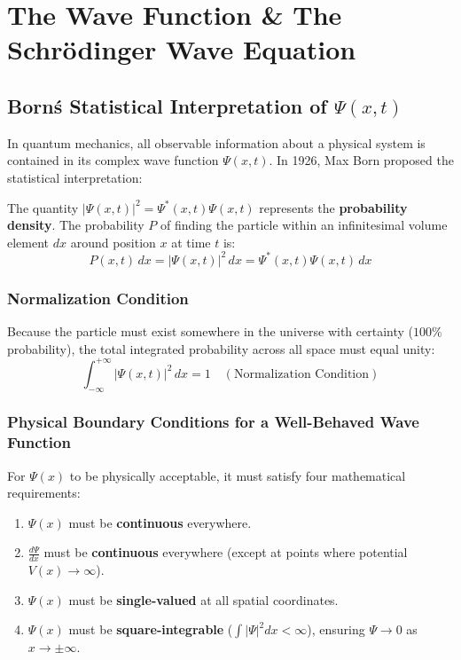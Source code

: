 \section{The Wave Function \& The Schrödinger Wave Equation}

\subsection{Born\'s Statistical Interpretation of \texorpdfstring{$\Psi(x,t)$}{Psi(x,t)}}
In quantum mechanics, all observable information about a physical system is contained in its complex wave function $\Psi(x,t)$. In 1926, Max Born proposed the statistical interpretation:

\begin{definition}
The quantity $|\Psi(x,t)|^2 = \Psi^*(x,t) \Psi(x,t)$ represents the \textbf{probability density}. The probability $P$ of finding the particle within an infinitesimal volume element $dx$ around position $x$ at time $t$ is:
\begin{equation}
    P(x,t)\,dx = |\Psi(x,t)|^2\,dx = \Psi^*(x,t)\Psi(x,t)\,dx
\end{equation}
\end{definition}

\subsubsection{Normalization Condition}
Because the particle must exist somewhere in the universe with certainty ($100\%$ probability), the total integrated probability across all space must equal unity:
\begin{equation}
    \int_{-\infty}^{+\infty} |\Psi(x,t)|^2\,dx = 1 \quad (\text{Normalization Condition})
\end{equation}

\subsubsection{Physical Boundary Conditions for a Well-Behaved Wave Function}
For $\Psi(x)$ to be physically acceptable, it must satisfy four mathematical requirements:
\begin{enumerate}
    \item $\Psi(x)$ must be \textbf{continuous} everywhere.
    \item $\frac{d\Psi}{dx}$ must be \textbf{continuous} everywhere (except at points where potential $V(x) \to \infty$).
    \item $\Psi(x)$ must be \textbf{single-valued} at all spatial coordinates.
    \item $\Psi(x)$ must be \textbf{square-integrable} ($\int |\Psi|^2 dx < \infty$), ensuring $\Psi \to 0$ as $x \to \pm\infty$.
\end{enumerate}

